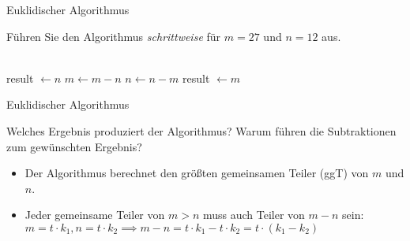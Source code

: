 \begin{frame}{Euklidischer Algorithmus}
    \begin{exercise}[a)]
        Führen Sie den Algorithmus \textit{schrittweise} für $m=27$ und $n=12$ aus.
    \end{exercise}
    \pause[]
    \begin{solve}
        \begin{minipage}{0.5\textwidth}
        \scriptsize
        \begin{algorithmic}
            \\
                \State result $\gets n$
            \Else
                        \State $m\gets m-n$
                    \Else
                        \State $n\gets n-m$
                    \EndIf
                \EndWhile
                \State result $\gets m$
            \EndIf
        \end{algorithmic}
    \end{minipage}
    \end{solve}
\end{frame}
\addtocounter{exercise}{-1}\addtocounter{solve}{-1}%
\begin{frame}[fragile]{Euklidischer Algorithmus}
    \begin{exercise}[b)]
        Welches Ergebnis produziert der Algorithmus? Warum führen die Subtraktionen zum gewünschten Ergebnis?
    \end{exercise}
    \pause[]
    \begin{solve}[b)]
        \begin{itemize}
            \item Der Algorithmus berechnet den größten gemeinsamen Teiler (ggT) von $m$ und $n$.
            \pause[]\item Jeder gemeinsame Teiler von $m>n$ muss auch Teiler von $m-n$ sein: $m=t\cdot k_1, n=t\cdot k_2\implies m-n=t\cdot k_1-t\cdot k_2=t\cdot\left(k_1-k_2\right)$
        \end{itemize}
    \end{solve}
\end{frame}
